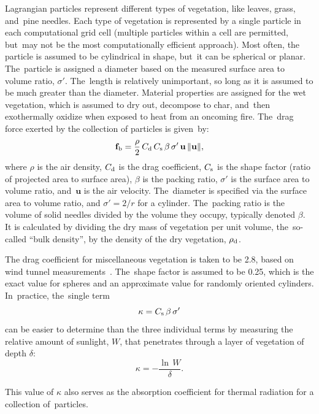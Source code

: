 \documentclass[atmosphere,article,accept,moreauthors,pdftex]{Definitions/mdpi}
\begin{document}
\begin{paracol}{2}
Lagrangian particles represent different types of vegetation, like leaves, grass, and~pine needles. Each type of vegetation is represented by a single particle in each computational grid cell (multiple particles within a cell are permitted, but~may not be the most computationally efficient approach).
Most often, the particle is assumed to be cylindrical in shape, but~it can be spherical or planar. The~particle is assigned a diameter based on the measured surface area to volume ratio, $\sigma'$. The~length is relatively unimportant, so long as it is assumed to be much greater than the diameter. Material properties are assigned for the wet vegetation, which is assumed to dry out, decompose to char, and~then exothermally oxidize when exposed to heat from an oncoming fire. The~drag force exerted by the collection of particles is \mbox{given by}:
\begin{equation}
   \mathbf{f}_{\rm b} = \frac{\rho}{2} \, C_{\rm d} \, C_{\rm s} \, \beta \, \sigma' \, \mathbf{u} \, \|\mathbf{u}\|,
   \label{drag}
\end{equation}
where $\rho$ is the air density, $C_{\rm d}$ is the drag coefficient, $C_{\rm s}$ is the shape factor (ratio of projected area to surface area), $\beta$ is the packing ratio, $\sigma'$ is the surface area to volume ratio, and~$\mathbf{u}$ is the air velocity. The~diameter is specified via the surface area to volume ratio, and $\sigma'=2/r$ for a cylinder. The~packing ratio is the volume of solid needles divided by the volume they occupy, typically denoted $\beta$. It is calculated by dividing the dry mass of vegetation per unit volume, the~so-called ``bulk density'', by the density of the dry vegetation, $\rho_{\rm d}$.

The drag coefficient for miscellaneous vegetation is taken to be 2.8, based on wind tunnel measurements~\cite{Falkenstein-Smith:2018}. The~shape factor is assumed to be 0.25, which is the exact value for spheres and an approximate value for randomly oriented cylinders. In~practice, the~single term
\begin{equation}
   \kappa = C_{\rm s}  \, \beta \, \sigma'
\end{equation}
can be easier to determine than the three individual terms by measuring the relative amount of sunlight, $W$, that penetrates through a layer of vegetation of depth $\delta$:
\begin{equation}
   \kappa = -\frac{\ln \, W}{\delta}.
\end{equation}

This value of $\kappa$ also serves as the absorption coefficient for thermal radiation for a collection of~particles.


\end{paracol}
\end{document}
